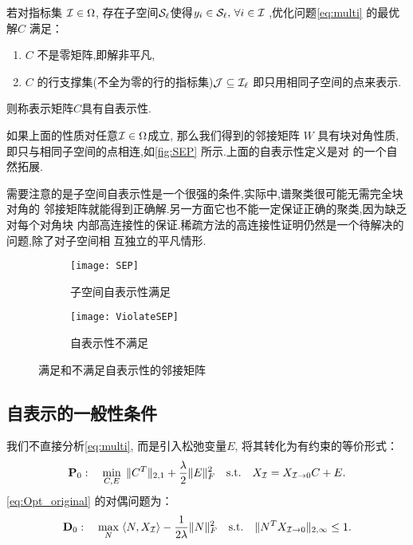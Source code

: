 \begin{definition}[子空间自表示性]\label{def:lasso_detection}
  若对指标集 \(\mathcal{I}\in \Omega\), 存在子空间\(\mathcal{S}_\ell\)使得\(y_i\in \mathcal{S}_\ell,\,
  \forall i \in \mathcal{I}\) ,优化问题\eqref{eq:multi} 的最优解\(C\) 满足：
  \begin{enumerate}
    \item \(C\) 不是零矩阵,即解非平凡,
    \item \(C\) 的行支撑集(不全为零的行的指标集)\(\mathcal{J}\subseteq \mathcal{I}_\ell\)
      即只用相同子空间的点来表示.
  \end{enumerate}
  则称表示矩阵\(C\)具有自表示性.
\end{definition}

如果上面的性质对任意\(\mathcal{I} \in \Omega\)成立, 那么我们得到的邻接矩阵 \(W\)
具有块对角性质,即只与相同子空间的点相连,如\autoref{fig:SEP} 
所示.上面的自表示性定义是对 \cite[定义~1.1]{elhamifar2013sparse}
的一个自然拓展.

需要注意的是子空间自表示性是一个很强的条件,实际中,谱聚类很可能无需完全块对角的
邻接矩阵就能得到正确解.另一方面它也不能一定保证正确的聚类,因为缺乏对每个对角块
内部高连接性的保证.稀疏方法的高连接性证明仍然是一个待解决的问题,除了对子空间相
互独立的平凡情形\cite{liu2013robust, wang2013provable}.
\begin{figure}[tb]
  \centering
  \begin{subfigure}[b]{0.4\textwidth}
    \texttt{[image: SEP]}
    \caption{子空间自表示性满足}
  \end{subfigure}
  \begin{subfigure}[b]{0.4\textwidth}
    \texttt{[image: ViolateSEP]}
    \caption{自表示性不满足}
  \end{subfigure}
  \caption{满足和不满足自表示性的邻接矩阵}
  \label{fig:SEP}
\end{figure}

\subsection{自表示的一般性条件}
我们不直接分析\eqref{eq:multi},   而是引入松弛变量\(E\), 将其转化为有约束的等价形式：
\begin{equation}\label{eq:Opt_original}
  \mathbf{P}_0:\quad \min_{C, E} \;
  \|C^T\|_{2,1}+\frac{\lambda}{2}\|E\|_F^2 \quad
  \text{s.t.} \quad X_{\mathcal{I}}=X_{\mathcal{I}\rightarrow 0}C+E.
\end{equation}
\eqref{eq:Opt_original} 的对偶问题为：
\begin{equation}\label{eq:Opt_original_dual}
  \mathbf{D}_0:\quad \max_{N} \; \langle N, X_{\mathcal{I}}\rangle -
  \frac{1}{2\lambda}\|N\|_F^2 \quad
  \text{s.t.} \quad \|N^T X_{\mathcal{I}\rightarrow 0}\|_{2,\infty} \leq 1.
\end{equation}

